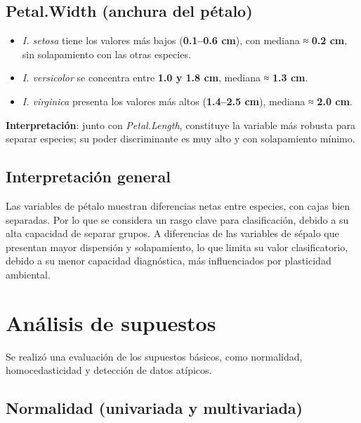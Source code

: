 \documentclass[
  spanish,
  11pt,
  a4paper,
  DIV=11,
  numbers=noendperiod]{scrartcl}
\providecommand{\tightlist}{%
  \setlength{\itemsep}{0pt}\setlength{\parskip}{0pt}}
\begin{document}
\subsection{Petal.Width (anchura del
pétalo)}\label{petal.width-anchura-del-puxe9talo}

\begin{itemize}
\tightlist
\item
  \emph{I. setosa} tiene los valores más bajos (\textbf{0.1--0.6 cm}),
  con mediana ≈ \textbf{0.2 cm}, sin solapamiento con las otras
  especies.\\
\item
  \emph{I. versicolor} se concentra entre \textbf{1.0 y 1.8 cm}, mediana
  ≈ \textbf{1.3 cm}.\\
\item
  \emph{I. virginica} presenta los valores más altos (\textbf{1.4--2.5
  cm}), mediana ≈ \textbf{2.0 cm}.
\end{itemize}

\textbf{Interpretación}: junto con \emph{Petal.Length}, constituye la
variable más robusta para separar especies; su poder discriminante es
muy alto y con solapamiento mínimo.

\subsection{Interpretación general}\label{interpretaciuxf3n-general-1}

Las variables de pétalo muestran diferencias netas entre especies, con
cajas bien separadas. Por lo que se considera un rasgo clave para
clasificación, debido a su alta capacidad de separar grupos. A
diferencias de las variables de sépalo que presentan mayor dispersión y
solapamiento, lo que limita su valor clasificatorio, debido a su menor
capacidad diagnóstica, más influenciados por plasticidad ambiental.

\section{Análisis de supuestos}\label{anuxe1lisis-de-supuestos}

Se realizó una evaluación de los supuestos básicos, como normalidad,
homocedasticidad y detección de datos atípicos.

\subsection{Normalidad (univariada y
multivariada)}\label{normalidad-univariada-y-multivariada}
\end{document}
